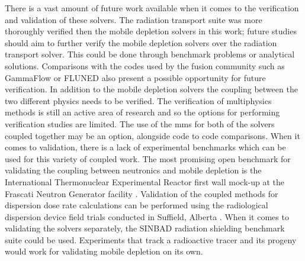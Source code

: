 There is a vast amount of future work available when it comes to the verification and validation of these solvers. The radiation transport suite was more thoroughly verified then the mobile depletion solvers in this work; future studies should aim to further verify the mobile depletion solvers over the radiation transport solver. This could be done through benchmark problems or analytical solutions. Comparisons with the codes used by the fusion community such as GammaFlow \cite{fusion_activation_wall} or FLUNED \cite{fusion_activation_tool_fluned} also present a possible opportunity for future verification. In addition to the mobile depletion solvers the coupling between the two different physics needs to be verified. The verification of multiphysics methods is still an active area of research and so the options for performing verification studies are limited. The use of the \acrshort{mms} for both of the solvers coupled together may be an option, alongside code to code comparisons. When it comes to validation, there is a lack of experimental benchmarks which can be used for this variety of coupled work. The most promising open benchmark for validating the coupling between neutronics and mobile depletion is the International Thermonuclear Experimental Reactor first wall mock-up at the Frascati Neutron Generator facility \cite{fusion_activation_wall}. Validation of the coupled methods for dispersion dose rate calculations can be performed using the radiological dispersion device field trials conducted in Suffield, Alberta \cite{nf_rdd_trials_i, nf_rdd_trials_ii}. When it comes to validating the solvers separately, the SINBAD radiation shielding benchmark suite \cite{sinbad} could be used. Experiments that track a radioactive tracer and its progeny would work for validating mobile depletion on its own. 